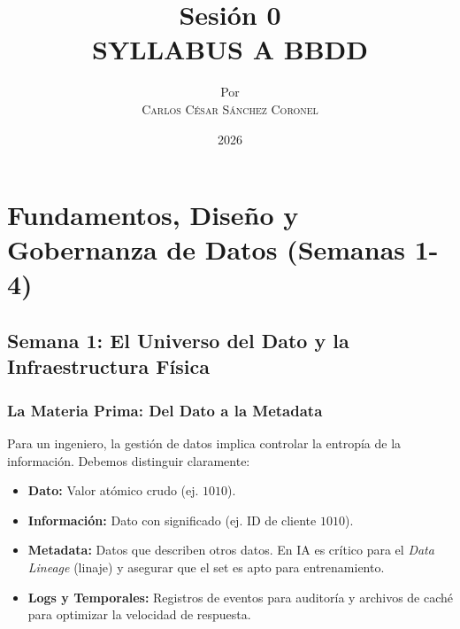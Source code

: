 \documentclass[12pt,a4paper,openany,oneside]{book}
\title{
    \textbf{Sesión 0} \\ 
    \Huge \textbf{SYLLABUS A BBDD }
}
\author{
    \small Por \\ \vspace{0.2cm}
    \Large \textsc{Carlos César Sánchez Coronel}
}
\date{2026}
\begin{document}
\maketitle
\tableofcontents






\chapter{Fundamentos, Diseño y Gobernanza de Datos (Semanas 1-4)}

\section{Semana 1: El Universo del Dato y la Infraestructura Física}

\subsection{La Materia Prima: Del Dato a la Metadata}
Para un ingeniero, la gestión de datos implica controlar la entropía de la información. Debemos distinguir claramente:
\begin{itemize}
    \item \textbf{Dato:} Valor atómico crudo (ej. $1010$).
    \item \textbf{Información:} Dato con significado (ej. ID de cliente $1010$).
    \item \textbf{Metadata:} Datos que describen otros datos. En IA es crítico para el \textit{Data Lineage} (linaje) y asegurar que el set es apto para entrenamiento.
    \item \textbf{Logs y Temporales:} Registros de eventos para auditoría y archivos de caché para optimizar la velocidad de respuesta.
\end{itemize}
\end{document}
